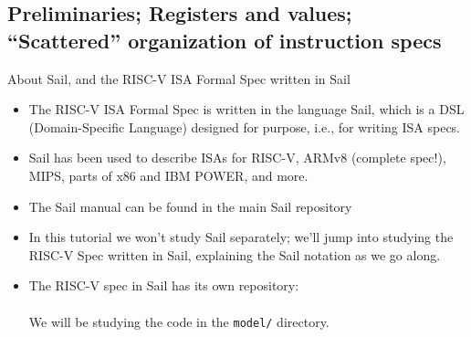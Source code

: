 \documentclass[aspectratio=169]{beamer}
\newcommand{\hmm}{\hspace*{2em}}
\newcommand{\slidefont}{\scriptsize}
\begin{document}

\subsection{Preliminaries; Registers and values; ``Scattered'' organization of instruction specs}


\begin{frame}[fragile]

  \slidefont

  \begin{block}{About Sail, and the RISC-V ISA Formal Spec written in Sail}
    \begin{itemize}

      \item The RISC-V ISA Formal Spec is written in the language
        Sail, which is a DSL (Domain-Specific Language) designed for
        purpose, i.e., for writing ISA specs.

      \item Sail has been used to describe ISAs for RISC-V, ARMv8
        (complete spec!), MIPS, parts of x86 and IBM POWER, and more.

      \item The Sail manual can be found in the main Sail repository \\
        \hmm {\tt https://github.com/rems-project/sail}

      \item In this tutorial we won't study Sail separately; we'll
        jump into studying the RISC-V Spec written in Sail, explaining
        the Sail notation as we go along.

      \item The RISC-V spec in Sail has its own repository: \\
        \hmm {\tt https://github.com/rems-project/sail-riscv} \\
        We will be studying the code in the {\tt model/} directory.

    \end{itemize}
  \end{block}

\end{frame}

\end{document}
